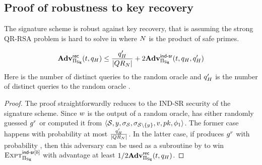 \subsection{Proof of robustness to key recovery}

\begin{theorem}
\label{thm:robustness}
	The signature scheme \ourSigScheme is robust against key recovery, that is 
	assuming the strong QR-RSA problem is hard to solve in \qrGroup where $N$ is the product of safe primes.
	
	\[
	\recoverAdv \le   \frac{\oracleQueries' }{\setSize{\qrGroup}}  + 2 \Advantage{\indsrLabel}{\sigScheme}(\timeBound, 
	\oracleQueries, \oracleQueries')
	\]
Here \oracleQueries is the number of distinct queries to the random oracle \primeRO and 
$q_H'$ is the number of distinct queries to the random oracle \ro.


\end{theorem}

\begin{proof}
The proof straightforwardly reduces to the IND-SR security of the signature scheme. Since $\genericSigPair[2]$ is the output of a random oracle,  has either randomly guessed $\qrGen^{\genericRand}$ or computed it from $\langle \genericSetVar, \genericCInputElmt, \genericSig[\genericSetVar], \genericSig[\genericSetVar \setminus \{\genericCInputElmt\}],  \genericSigPair[1], \pubKey, \adversaryState{1} \rangle$. The former case happens with probability at most $\frac{q_H' }{\left|{QR_{N}}\right|} $. In the latter case, if  produces $\qrGen^{\genericRand}$ with probability \recoverAdv, then this adversary can be used as a subroutine by  to win $\Experiment{\indsrLabel[\indBit]}{\sigScheme}$ with advantage  at least $1/2 \mathbf{Adv}^{\scriptsize\textsf{rec}}_{\Pi_{\mathsf{Sig}} }(t, q_H)$. 
\end{proof}